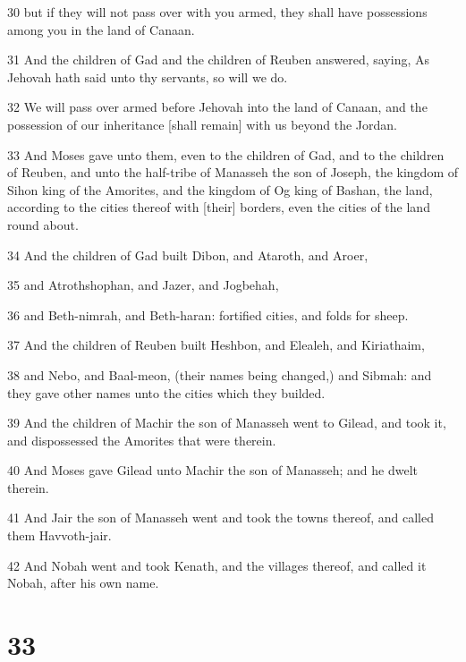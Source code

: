 \par 30 but if they will not pass over with you armed, they shall have possessions among you in the land of Canaan.
\par 31 And the children of Gad and the children of Reuben answered, saying, As Jehovah hath said unto thy servants, so will we do.
\par 32 We will pass over armed before Jehovah into the land of Canaan, and the possession of our inheritance [shall remain] with us beyond the Jordan.
\par 33 And Moses gave unto them, even to the children of Gad, and to the children of Reuben, and unto the half-tribe of Manasseh the son of Joseph, the kingdom of Sihon king of the Amorites, and the kingdom of Og king of Bashan, the land, according to the cities thereof with [their] borders, even the cities of the land round about.
\par 34 And the children of Gad built Dibon, and Ataroth, and Aroer,
\par 35 and Atrothshophan, and Jazer, and Jogbehah,
\par 36 and Beth-nimrah, and Beth-haran: fortified cities, and folds for sheep.
\par 37 And the children of Reuben built Heshbon, and Elealeh, and Kiriathaim,
\par 38 and Nebo, and Baal-meon, (their names being changed,) and Sibmah: and they gave other names unto the cities which they builded.
\par 39 And the children of Machir the son of Manasseh went to Gilead, and took it, and dispossessed the Amorites that were therein.
\par 40 And Moses gave Gilead unto Machir the son of Manasseh; and he dwelt therein.
\par 41 And Jair the son of Manasseh went and took the towns thereof, and called them Havvoth-jair.
\par 42 And Nobah went and took Kenath, and the villages thereof, and called it Nobah, after his own name.

\chapter{33}


